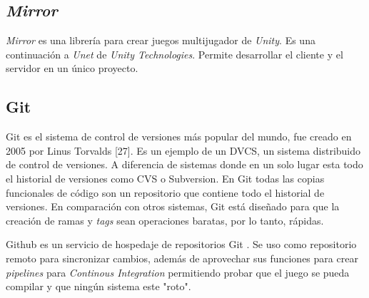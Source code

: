 \subsection{\textit{Mirror}}
\textit{Mirror} es una librería para crear juegos multijugador de \textit{Unity}. Es una continuación a \textit{Unet} de \textit{Unity Technologies}. Permite desarrollar el cliente y el servidor en un único proyecto.

\subsection{Git}
Git es el sistema de control de versiones más popular del mundo, fue creado en 2005 por Linus Torvalds [27]. Es un ejemplo de un DVCS, un sistema distribuido de control de versiones. A diferencia de sistemas donde en un solo lugar esta todo el historial de versiones como CVS o Subversion. En Git todas las copias funcionales de código son un repositorio que contiene todo el historial de versiones.
En comparación con otros sistemas, Git está diseñado para que la creación de ramas y \textit{tags} sean operaciones baratas, por lo tanto, rápidas.

Github es un servicio de hospedaje de repositorios Git \cite{finley2012a}. Se uso como repositorio remoto para sincronizar cambios, además de aprovechar sus funciones para crear \textit{pipelines} para \textit{Continous Integration} permitiendo probar que el juego se pueda compilar y que ningún sistema este "roto".